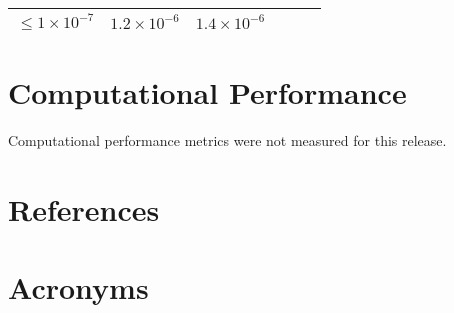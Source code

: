 \documentclass[DM, lsstdraft, toc]{lsstdoc}
\begin{document}
\begin{longtable}[]{@{}llllll@{}}
\begin{minipage}[t]{0.14\columnwidth}
\(\leq 1\times10^{-7}\)\strut
\end{minipage} & \begin{minipage}[t]{0.12\columnwidth}\raggedright\strut
\(1.2\times10^{-6}\)\strut
\end{minipage} & \begin{minipage}[t]{0.12\columnwidth}\raggedright\strut
\(1.4\times10^{-6}\)\strut
\end{minipage} & \begin{minipage}[t]{0.17\columnwidth}\raggedright\strut
\strut
\end{minipage}\tabularnewline
\bottomrule
\end{longtable}

\section{Computational Performance}\label{computational-performance}

Computational performance metrics were not measured for this release.

\appendix

\section{References} \label{sec:bib}
\renewcommand{\refname}{} %


\section{Acronyms} \label{sec:acronyms}

\end{document}
